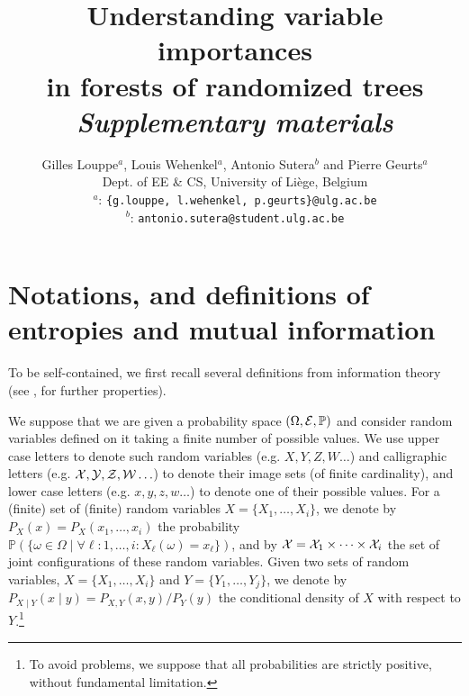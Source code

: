\documentclass{article}
\title{\textbf{Understanding variable importances\\
in forests of randomized trees\\
\textit{Supplementary materials}}}
\author{
Gilles Louppe$^{a}$, Louis Wehenkel$^{a}$, Antonio Sutera$^{b}$ and Pierre Geurts$^{a}$ \\
Dept. of EE \& CS, University of Liège, Belgium \\
$^{a}$: \texttt{\{g.louppe, l.wehenkel, p.geurts\}@ulg.ac.be}\\
$^{b}$: \texttt{antonio.sutera@student.ulg.ac.be}\\
}
\begin{document}
\maketitle
\allowdisplaybreaks




\appendix



\section{Notations, and definitions of entropies and mutual information}

To be self-contained, we first recall several definitions from information theory (see \cite{cover2012elements}, for further properties).

We suppose that we are given a probability space $(\Omega, {\cal E}, \mathbb{P})$ and  consider random variables
defined on it taking a finite number of possible values. We use upper case letters to denote such random variables (e.g. $X, Y, Z, W \ldots$)  and calligraphic letters (e.g. $\cal X, Y, Z, W \ldots$) to denote their image sets (of finite cardinality), and lower case letters (e.g. $x, y, z, w \ldots$) to denote one of their possible values.
For a (finite) set of (finite) random variables $ X = \{X_{1}, \ldots , X_{i}\}$, we denote by $P_{X}(x) = P_{X}(x_{1}, \ldots , x_{i})$ the probability $\mathbb{P}(\{ \omega \in \Omega \mid  \forall \ell : 1, \ldots, i: X_{\ell}(\omega) =x_{\ell}\})$, and by ${\cal X} = {\cal X}_{1} \times \cdots \times {\cal X}_{i}$ the set of joint configurations of these random variables. Given two sets of random variables, $X = \{X_{1}, \ldots , X_{i}\}$ and $Y=\{Y_{1}, \ldots , Y_{j}\}$, we denote by $P_{X \mid Y}(x \mid y) = {P_{X, Y} (x,  y)}/ {P_{Y}(y)}$ the conditional density of $X$ with respect to $Y$.\footnote{To avoid problems, we suppose that all probabilities are strictly positive, without fundamental limitation.}
\end{document}

